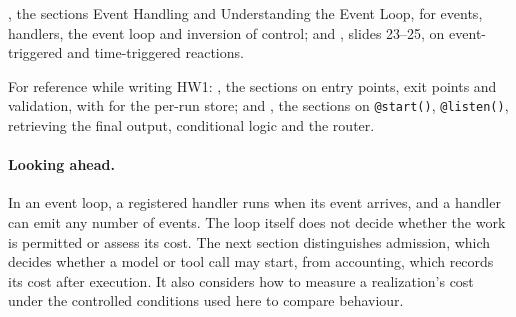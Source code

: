 \citet{cornell-cs2110-lec25}, the sections Event Handling and Understanding the Event
Loop, for events, handlers, the event loop and inversion of control; and \citet{seshia2015discrete},
slides 23--25, on event-triggered and time-triggered reactions.

For reference while writing HW1: \citet{llamaindex-workflows}, the sections on entry points, exit
points and validation, with \citet{llamaindex-workflows-state} for the per-run store; and
\citet{crewai-flows}, the sections on \texttt{@start()}, \texttt{@listen()}, retrieving the final
output, conditional logic and the router.

\paragraph{Looking ahead.} In an event loop, a registered handler runs when its event arrives, and
a handler can emit any number of events. The loop itself does not decide whether the work is
permitted or assess its cost. The next section distinguishes admission, which decides whether a
model or tool call may start, from accounting, which records its cost after execution. It also
considers how to measure a realization's cost under the controlled conditions used here to compare
behaviour.
